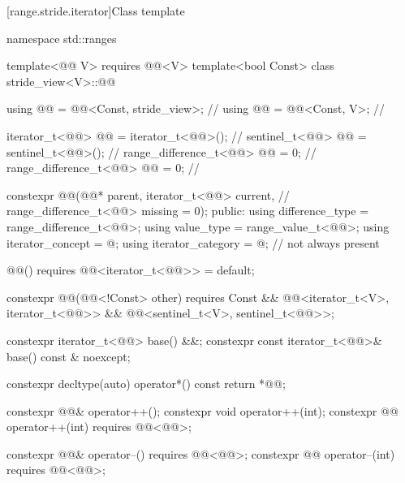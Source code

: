[range.stride.iterator]{Class template }

\begin{codeblock}
namespace std::ranges {
  template<@@ V>
    requires @@<V>
  template<bool Const>
  class stride_view<V>::@@ {
    using @@ = @@<Const, stride_view>;                      // \expos
    using @@ = @@<Const, V>;                                  // \expos

    iterator_t<@@> @@ = iterator_t<@@>();                      // \expos
    sentinel_t<@@> @@ = sentinel_t<@@>();                          // \expos
    range_difference_t<@@> @@ = 0;                                // \expos
    range_difference_t<@@> @@ = 0;                               // \expos

    constexpr @@(@@* parent, iterator_t<@@> current,        // \expos
                       range_difference_t<@@> missing = 0);
  public:
    using difference_type = range_difference_t<@@>;
    using value_type = range_value_t<@@>;
    using iterator_concept = @\seebelow@;
    using iterator_category = @\seebelow@;    // not always present

    @@() requires @@<iterator_t<@@>> = default;

    constexpr @@(@@<!Const> other)
      requires Const && @@<iterator_t<V>, iterator_t<@@>>
                     && @@<sentinel_t<V>, sentinel_t<@@>>;

    constexpr iterator_t<@@> base() &&;
    constexpr const iterator_t<@@>& base() const & noexcept;

    constexpr decltype(auto) operator*() const { return *@@; }

    constexpr @@& operator++();
    constexpr void operator++(int);
    constexpr @@ operator++(int) requires @@<@@>;

    constexpr @@& operator--() requires @@<@@>;
    constexpr @@ operator--(int) requires @@<@@>;

}}
\end{codeblock}
